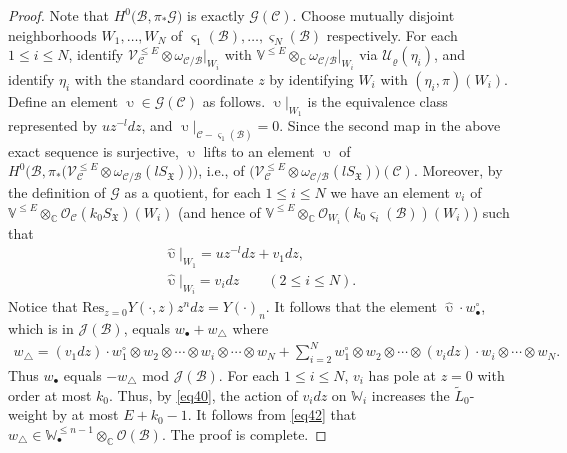 \documentclass[12pt,a4paper,notitlepage]{article}
\theoremstyle{definition}
\theoremstyle{plain}
\newcommand{\fk}{\mathfrak}
\newcommand{\mc}{\mathcal}
\newcommand{\wtd}{\widetilde}
\newcommand{\wht}{\widehat}
\newcommand{\Res}{\mathrm{Res}}
\newcommand{\scr}{\mathscr}
\newcommand{\sgm}{\varsigma}
\newcommand{\blt}{\bullet}
\newcommand{\Vbb}{\mathbb V}
\newcommand{\Wbb}{\mathbb W}
\newcommand{\Cbb}{\mathbb C}
\numberwithin{equation}{section}
\begin{document}
\begin{proof}
	Note that $H^0\big(\mc B,\pi_*\scr G\big)$ is exactly $\scr G(\mc C)$. Choose mutually disjoint neighborhoods $W_1,\dots,W_N$ of $\sgm_1(\mc B),\dots,\sgm_N(\mc B)$ respectively. For each $1\leq i\leq N$, identify $\scr V_{\mc C}^{\leq E}\otimes\omega_{\mc C/\mc B}|_{W_i}$ with $\Vbb^{\leq E}\otimes_\Cbb\omega_{\mc C/\mc B}|_{W_i}$ via $\mc U_\varrho(\eta_i)$, and identify $\eta_i$ with the standard coordinate $z$ by identifying $W_i$ with $(\eta_i,\pi)(W_i)$. Define an element $\upupsilon\in\scr G(\mc C)$ as follows. $\upupsilon|_{W_1}$ is the equivalence class represented by $uz^{-l}dz$, and $\upupsilon|_{\mc C-\sgm_1(\mc B)}=0$. Since the second map in the above exact sequence is surjective, $\upupsilon$ lifts to an element $\wht\upupsilon$ of $H^0\big(\mc B,\pi_*\big(\scr V_{\mc C}^{\leq E}\otimes\omega_{\mc C/\mc B}(lS_{\fk X})\big)\big)$, i.e., of $\big(\scr V_{\mc C}^{\leq E}\otimes\omega_{\mc C/\mc B}(lS_{\fk X})\big)(\mc C)$. Moreover, by the definition of $\scr G$ as a quotient, for each $1\leq i\leq N$ we have an element $v_i$ of $\Vbb^{\leq E}\otimes_\Cbb\scr O_{\mc C}(k_0 S_{\fk X})(W_i)$ (and hence of $\Vbb^{\leq E}\otimes_\Cbb\scr O_{W_i}(k_0 \sgm_i(\mc B))(W_i)$) such that
	\begin{gather*}
	\wht\upupsilon|_{W_1}=uz^{-l}dz+v_1dz,\\
	\wht\upupsilon|_{W_i}=v_idz\qquad(2\leq i\leq N).
	\end{gather*}
	Notice that $\Res_{z=0}Y(\cdot,z)z^ndz=Y(\cdot)_n$. It follows that the element $\wht\upupsilon\cdot w_\blt^\circ$, which is in $\scr J(\mc B)$,  equals $w_\blt+w_\triangle$ where
	\begin{align*}
	w_\triangle=(v_1dz)\cdot w_1^\circ\otimes w_2\otimes\cdots \otimes  w_i\otimes\cdots\otimes w_N+\sum_{i=2}^Nw_1^\circ\otimes w_2\otimes\cdots \otimes (v_idz)\cdot w_i\otimes\cdots\otimes w_N.
	\end{align*}
	Thus $w_\blt$ equals $-w_\triangle$ mod $\scr J(\mc B)$. For each $1\leq i\leq N$, $v_i$ has pole at $z=0$ with order at most $k_0$. Thus, by \eqref{eq40}, the action of $v_idz$ on $\Wbb_i$ increases the $\wtd L_0$-weight by at most $E+k_0-1$. It follows from \eqref{eq42} that $w_\triangle\in\Wbb_\blt^{\leq {n-1}}\otimes_\Cbb\scr O(\mc B)$. The proof is complete.
\end{proof}
\end{document}
